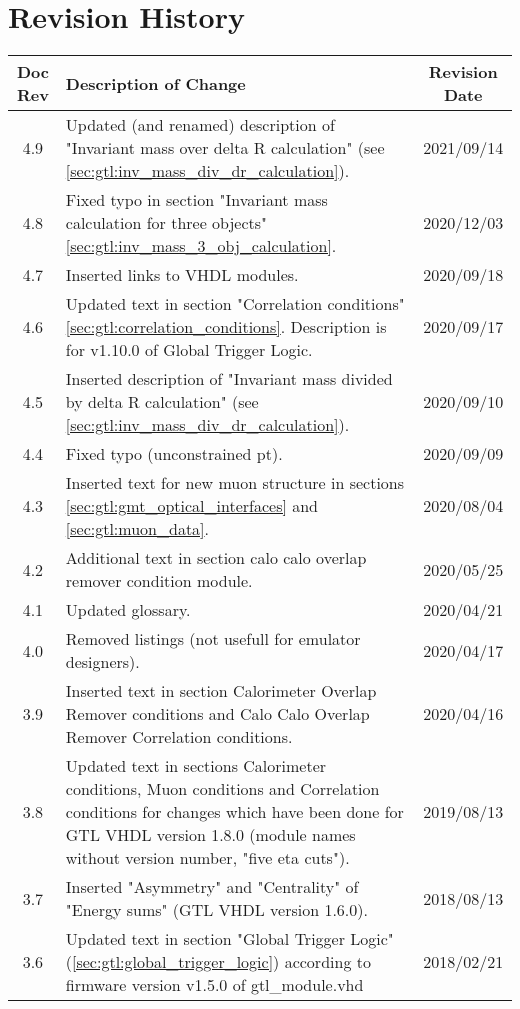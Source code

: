 \section*{Revision History}
\label{sec:revision_history}

\begin{longtable}{|c|p{}|c|}
\hline
Doc Rev & Description of Change & Revision Date\\
\hline
\hline
\endhead
4.9 & Updated (and renamed) description of "Invariant mass over delta R calculation" (see \ref{sec:gtl:inv_mass_div_dr_calculation}). & 2021/09/14\\
4.8 & Fixed typo in section "Invariant mass calculation for three objects" \ref{sec:gtl:inv_mass_3_obj_calculation}. & 2020/12/03\\
4.7 & Inserted links to VHDL modules. & 2020/09/18\\
4.6 & Updated text in section "Correlation conditions" \ref{sec:gtl:correlation_conditions}. Description is for v1.10.0 of Global Trigger Logic. & 2020/09/17\\
4.5 & Inserted description of "Invariant mass divided by delta R calculation" (see \ref{sec:gtl:inv_mass_div_dr_calculation}). & 2020/09/10\\
4.4 & Fixed typo (unconstrained pt). & 2020/09/09\\
4.3 & Inserted text for new muon structure in sections \ref{sec:gtl:gmt_optical_interfaces} and \ref{sec:gtl:muon_data}. & 2020/08/04\\
4.2 & Additional text in section calo calo overlap remover condition module. & 2020/05/25\\
4.1 & Updated glossary. & 2020/04/21\\
4.0 & Removed listings (not usefull for emulator designers). & 2020/04/17\\
3.9 & Inserted text in section Calorimeter Overlap Remover conditions and Calo Calo Overlap Remover Correlation conditions. & 2020/04/16\\
3.8 & Updated text in sections Calorimeter conditions, Muon conditions and Correlation conditions for changes which have been done for GTL VHDL version 1.8.0 (module names without version number, "five eta cuts"). & 2019/08/13\\
3.7 & Inserted "Asymmetry" and "Centrality" of "Energy sums" (GTL VHDL version 1.6.0). & 2018/08/13\\
3.6 & Updated text in section "Global Trigger Logic" (\ref{sec:gtl:global_trigger_logic}) according to firmware version v1.5.0 of gtl\_module.vhd & 2018/02/21\\

\end{longtable}
